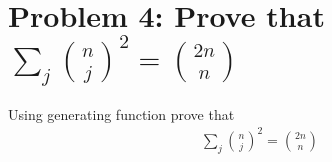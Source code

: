 ﻿\section{Problem 4: Prove that $\sum_{j} \binom{n}{j}^2 = \binom{2n}{n}$}
\label{sec:problem-4}
Using generating function prove that
\begin{align*}
    \sum_{j} \binom{n}{j}^2 = \binom{2n}{n}
\end{align*}

\clearpage
